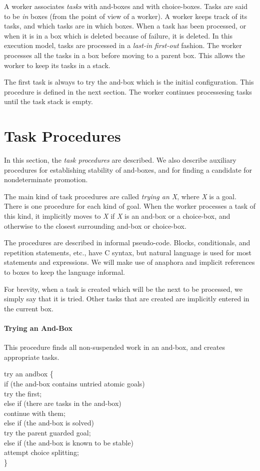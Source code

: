 A worker associates {\em tasks} with and-boxes and with choice-boxes.
Tasks are said to be {\em in} boxes (from the point of view of a
worker).  A worker keeps track of its tasks, and which tasks are in
which boxes.  When a task has been processed, or when it is in a box
which is deleted because of failure, it is deleted.  In this execution
model, tasks are processed in a {\em last-in first-out} fashion.  The
worker processes all the tasks in a box before moving to a parent box.
This allows the worker to keep its tasks in a stack.

The first task is always to try the and-box which is the initial
configuration.  This procedure is defined in the next section.
The worker continues processesing tasks until the task stack
is empty.

\section{Task Procedures} \label{sec:taskproc}

In this section, the {\em task procedures} are described.  We also
describe auxiliary procedures for establishing stability of and-boxes,
and for finding a candidate for nondeterminate promotion.

The main kind of task procedures are called {\em trying an X}, where
{\em X} is a goal.  There is one procedure for each kind of goal.
When the worker processes a task of this kind, it implicitly moves to
{\em X} if {\em X} is an and-box or a choice-box, and otherwise to the
closest surrounding and-box or choice-box.

The procedures are described in informal pseudo-code.  Blocks,
conditionals, and repetition statements, etc., have C syntax, but
natural language is used for most statements and expressions.  We will
make use of anaphora and implicit references to boxes to keep the
language informal.

For brevity, when a task is created which will be the next to be
processed, we simply say that it is tried.  Other tasks that are
created are implicitly entered in the current box.

\paragraph{Trying an And-Box} This procedure finds all non-suspended work
in an and-box, and creates appropriate tasks.
%
\begin{program}
try an andbox \{\\
\>if (the and-box contains untried atomic goals)\\
\>\>try the first;\\
\>else if (there are tasks in the and-box)\\
\>\>continue with them;\\
\>else if (the and-box is solved)\\
\>\>try the parent guarded goal;\\
\>else if (the and-box is known to be stable)\\
\>\>attempt choice splitting;\\
\}
\end{program}

